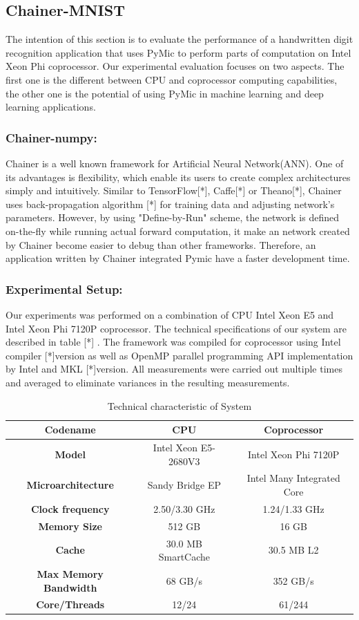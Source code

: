 \subsection{Chainer-MNIST}
%
The intention of this section is to evaluate the performance of a handwritten digit recognition application that uses PyMic to perform parts of computation on Intel Xeon Phi coprocessor. Our experimental evaluation focuses on two aspects. The first one is the different between CPU and coprocessor computing capabilities, the other one is the potential of using PyMic in machine learning and deep learning applications.
\subsubsection{Chainer-numpy:}
%
Chainer is a well known framework for Artificial Neural Network(ANN). One of its advantages is flexibility, which enable its users to create complex architectures simply and intuitively. Similar to TensorFlow[*], Caffe[*] or Theano[*], Chainer uses back-propagation algorithm [*] for training data and adjusting network's parameters. However, by using "Define-by-Run" scheme,  the network is defined on-the-fly while running actual forward computation, it make an network created by Chainer become easier to debug than other frameworks. Therefore, an application written by Chainer integrated Pymic have a faster development time.
%

\subsubsection{Experimental Setup:}
%

Our experiments was performed on a combination of CPU Intel Xeon E5 and Intel Xeon Phi 7120P coprocessor. The technical specifications of our system are described in table [*] . The framework was compiled for coprocessor using Intel compiler [*]version as well as OpenMP parallel programming API implementation by Intel  and MKL [*]version. All measurements were carried out multiple times and averaged to eliminate variances in the resulting measurements.
%
\begin{table}[]
\centering
\caption{Technical characteristic of System}
\begin{tabular}{|c|c|c|}
\hline
\textbf{Codename} 	& \textbf{CPU} 	& \textbf{Coprocessor} \\ \hline
\textbf{Model} & Intel Xeon E5-2680V3  & Intel Xeon Phi 7120P \\
\textbf{Microarchitecture} & Sandy Bridge EP & Intel Many Integrated Core \\
\textbf{Clock frequency} & 2.50/3.30 GHz & 1.24/1.33 GHz \\
\textbf{Memory Size} & 512 GB & 16 GB \\
\textbf{Cache} & 30.0 MB SmartCache & 30.5 MB L2 \\
\textbf{Max Memory Bandwidth} & 68 GB/s & 352 GB/s\\
\textbf{Core/Threads} & 12/24 & 61/244 \\
\hline
\end{tabular} 
\end{table}


